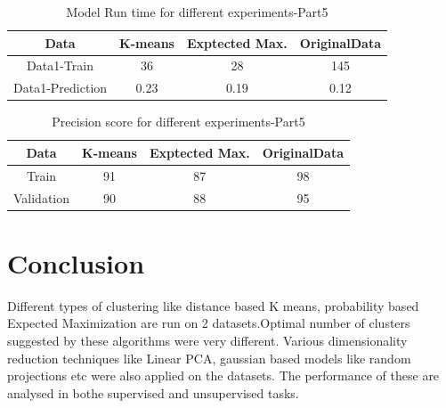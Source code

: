 \documentclass[12pt]{article}
\begin{document}
 \begin{center}
 \begin{table}
 \begin{tabular}{||c|c|c|c||} 
  \hline
Data & K-means & Exptected Max.& OriginalData\\ [0.5ex] 
 \hline
 Data1-Train &36 & 28& 145\\ 
 
 Data1-Prediction&0.23& 0.19& 0.12 \\ [1ex] 
 \hline
\end{tabular}
\caption{\label{tab:table-name}Model Run time for different experiments-Part5}
\end{table}

\end{center}

\begin{center}
\begin{table}
 \begin{tabular}{|| c|c|c|c||} 
 \hline
Data & K-means & Exptected Max.& OriginalData\\ [0.5ex] 
 \hline\hline
 Train& 91 &87 &98 \\ 
 \hline\hline
 Validation&90& 88& 95\\ [1ex] 
 \hline\hline

\end{tabular}
\caption{\label{tab:table-name}Precision score for different experiments-Part5}
\end{table}
\end{center}

\section{Conclusion}

Different types of clustering like distance based K means, probability based Expected Maximization are run on 2 datasets.Optimal number of clusters suggested by these algorithms were very different. Various dimensionality reduction techniques like Linear PCA, gaussian based models like random projections etc were also applied on the datasets. The performance of these are analysed in bothe supervised and unsupervised tasks.
\end{document}
